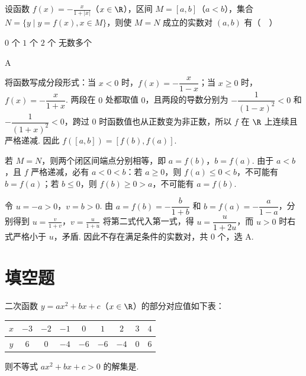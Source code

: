 \begin{problem}
设函数 \(f(x) = -\frac{x}{1 + |x|}\)（\(x \in \R\)），区间 \(M = [a, b]\)（\(a < b\)），集合 \(N = \{y \mid y = f(x), x \in M\}\)，则使 \(M = N\) 成立的实数对 \((a, b)\) 有（\(\quad\)）

\choices
    {\(0\) 个}
    {\(1\) 个}
    {\(2\) 个}
    {无数多个}
\end{problem}

\begin{answer}
A
\end{answer}

\begin{solution}
将函数写成分段形式：当 \(x<0\) 时，\(f(x)=-\dfrac{x}{1-x}\)；当 \(x\geqslant0\) 时，\(f(x)=-\dfrac{x}{1+x}\). 两段在 \(0\) 处都取值 \(0\)，且两段的导数分别为 \(-\dfrac{1}{(1-x)^2}<0\) 和 \(-\dfrac{1}{(1+x)^2}<0\)，跨过 \(0\) 时函数值也从正数变为非正数，所以 \(f\) 在 \(\R\) 上连续且严格递减. 因此 \(f([a,b])=[f(b),f(a)]\).

若 \(M=N\)，则两个闭区间端点分别相等，即 \(a=f(b)\)，\(b=f(a)\). 由于 \(a<b\)，且 \(f\) 严格递减，必有 \(a<0<b\)：若 \(a\geqslant0\)，则 \(f(a)\leqslant0<b\)，不可能有 \(b=f(a)\)；若 \(b\leqslant0\)，则 \(f(b)\geqslant0>a\)，不可能有 \(a=f(b)\).

令 \(u=-a>0\)，\(v=b>0\). 由 \(a=f(b)=-\dfrac{b}{1+b}\) 和 \(b=f(a)=-\dfrac{a}{1-a}\)，分别得到
\(u=\frac{v}{1+v}\)，\(v=\frac{u}{1+u}\)
将第二式代入第一式，得 \(u=\dfrac{u}{1+2u}\)，而 \(u>0\) 时右式严格小于 \(u\)，矛盾. 因此不存在满足条件的实数对，共 \(0\) 个，选 A.
\end{solution}

\section{填空题}
\begin{problem}
二次函数 \(y = ax^{2} + bx + c\)（\(x \in \R\)）的部分对应值如下表：

\begin{center}
\begin{tabular}{|c|c|c|c|c|c|c|c|c|}
\hline
\(x\) & \(-3\) & \(-2\) & \(-1\) & \(0\) & \(1\) & \(2\) & \(3\) & \(4\) \\
\hline
\(y\) & \(6\) & \(0\) & \(-4\) & \(-6\) & \(-6\) & \(-4\) & \(0\) & \(6\) \\
\hline
\end{tabular}
\end{center}

则不等式 \(ax^2 + bx + c > 0\) 的解集是\fillinblank{}.
\end{problem}

